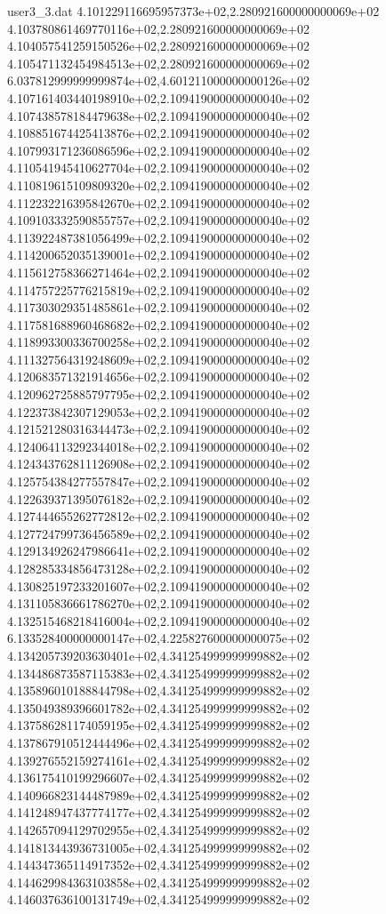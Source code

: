 \begin{filecontents}{user3_3.dat}
4.101229116695957373e+02,2.280921600000000069e+02
4.103780861469770116e+02,2.280921600000000069e+02
4.104057541259150526e+02,2.280921600000000069e+02
4.105471132454984513e+02,2.280921600000000069e+02
6.037812999999999874e+02,4.601211000000000126e+02
4.107161403440198910e+02,2.109419000000000040e+02
4.107438578184479638e+02,2.109419000000000040e+02
4.108851674425413876e+02,2.109419000000000040e+02
4.107993171236086596e+02,2.109419000000000040e+02
4.110541945410627704e+02,2.109419000000000040e+02
4.110819615109809320e+02,2.109419000000000040e+02
4.112232216395842670e+02,2.109419000000000040e+02
4.109103332590855757e+02,2.109419000000000040e+02
4.113922487381056499e+02,2.109419000000000040e+02
4.114200652035139001e+02,2.109419000000000040e+02
4.115612758366271464e+02,2.109419000000000040e+02
4.114757225776215819e+02,2.109419000000000040e+02
4.117303029351485861e+02,2.109419000000000040e+02
4.117581688960468682e+02,2.109419000000000040e+02
4.118993300336700258e+02,2.109419000000000040e+02
4.111327564319248609e+02,2.109419000000000040e+02
4.120683571321914656e+02,2.109419000000000040e+02
4.120962725885797795e+02,2.109419000000000040e+02
4.122373842307129053e+02,2.109419000000000040e+02
4.121521280316344473e+02,2.109419000000000040e+02
4.124064113292344018e+02,2.109419000000000040e+02
4.124343762811126908e+02,2.109419000000000040e+02
4.125754384277557847e+02,2.109419000000000040e+02
4.122639371395076182e+02,2.109419000000000040e+02
4.127444655262772812e+02,2.109419000000000040e+02
4.127724799736456589e+02,2.109419000000000040e+02
4.129134926247986641e+02,2.109419000000000040e+02
4.128285334856473128e+02,2.109419000000000040e+02
4.130825197233201607e+02,2.109419000000000040e+02
4.131105836661786270e+02,2.109419000000000040e+02
4.132515468218416004e+02,2.109419000000000040e+02
6.133528400000000147e+02,4.225827600000000075e+02
4.134205739203630401e+02,4.341254999999999882e+02
4.134486873587115383e+02,4.341254999999999882e+02
4.135896010188844798e+02,4.341254999999999882e+02
4.135049389396601782e+02,4.341254999999999882e+02
4.137586281174059195e+02,4.341254999999999882e+02
4.137867910512444496e+02,4.341254999999999882e+02
4.139276552159274161e+02,4.341254999999999882e+02
4.136175410199296607e+02,4.341254999999999882e+02
4.140966823144487989e+02,4.341254999999999882e+02
4.141248947437774177e+02,4.341254999999999882e+02
4.142657094129702955e+02,4.341254999999999882e+02
4.141813443936731005e+02,4.341254999999999882e+02
4.144347365114917352e+02,4.341254999999999882e+02
4.144629984363103858e+02,4.341254999999999882e+02
4.146037636100131749e+02,4.341254999999999882e+02

\end{filecontents}
